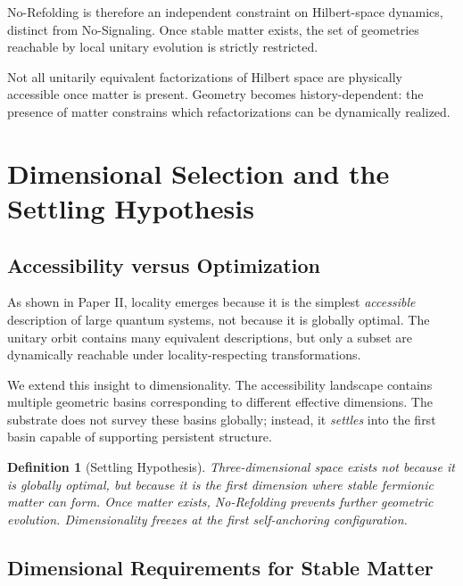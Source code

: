 \documentclass[11pt]{article}
\newtheorem{definition}{Definition}
\begin{document}
No-Refolding is therefore an independent constraint on Hilbert-space dynamics, distinct from No-Signaling. Once stable matter exists, the set of geometries reachable by local unitary evolution is strictly restricted.

Not all unitarily equivalent factorizations of Hilbert space are physically accessible once matter is present. Geometry becomes history-dependent: the presence of matter constrains which refactorizations can be dynamically realized.

\section{Dimensional Selection and the Settling Hypothesis}

\subsection{Accessibility versus Optimization}

As shown in Paper II, locality emerges because it is the simplest \emph{accessible} description of large quantum systems, not because it is globally optimal. The unitary orbit contains many equivalent descriptions, but only a subset are dynamically reachable under locality-respecting transformations.

We extend this insight to dimensionality. The accessibility landscape contains multiple geometric basins corresponding to different effective dimensions. The substrate does not survey these basins globally; instead, it \emph{settles} into the first basin capable of supporting persistent structure.

\begin{definition}[Settling Hypothesis]
Three-dimensional space exists not because it is globally optimal, but because it is the first dimension where stable fermionic matter can form. Once matter exists, No-Refolding prevents further geometric evolution. Dimensionality freezes at the first self-anchoring configuration.
\end{definition}

\subsection{Dimensional Requirements for Stable Matter}
\end{document}
